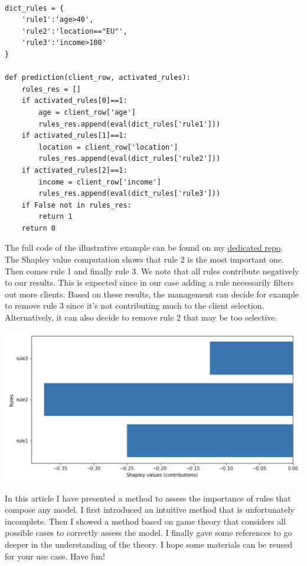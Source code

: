 \lstset{language=Python}
\lstset{frame=lines}
\lstset{basicstyle=\footnotesize}
\begin{lstlisting}

dict_rules = {
    'rule1':'age>40',
    'rule2':'location=="EU"',
    'rule3':'income>100'
}

def prediction(client_row, activated_rules):
    rules_res = []
    if activated_rules[0]==1:
        age = client_row['age']
        rules_res.append(eval(dict_rules['rule1']))
    if activated_rules[1]==1:
        location = client_row['location']
        rules_res.append(eval(dict_rules['rule2']))
    if activated_rules[2]==1:
        income = client_row['income']
        rules_res.append(eval(dict_rules['rule3']))
    if False not in rules_res:
        return 1
    return 0

\end{lstlisting}

The full code of the illustrative example can be found on my \href{https://github.com/savoga/shap-explain}{dedicated repo}. \\

The Shapley value computation shows that rule 2 is the most important one. Then comes rule 1 and finally rule 3. We note that all rules contribute negatively to our results. This is expected since in our case adding a rule necessarily filters out more clients. Based on these results, the management can decide for example to remove rule 3 since it's not contributing much to the client selection. Alternatively, it can also decide to remove rule 2 that may be too selective.

\begin{center}
\includegraphics[scale=0.6]{./../img/shapley-results.png}
\end{center}

In this article I have presented a method to assess the importance of rules that compose any model. I first introduced an intuitive method that is unfortunately incomplete. Then I showed a method based on game theory that considers all possible cases to correctly assess the model. I finally gave some references to go deeper in the understanding of the theory. I hope some materials can be reused for your use case. Have fun!


\vspace{10mm}